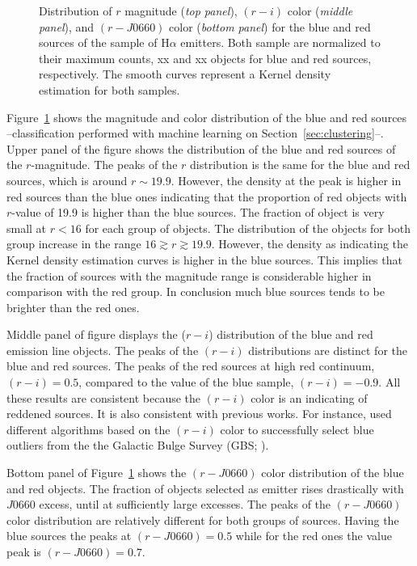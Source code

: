 \documentclass[fleqn,usenatbib]{mnras}
\begin{document}
\begin{figure}
\begin{tabular}{l l l}
  \end{tabular}
  \caption{Distribution of $r$ magnitude  (\textit{top panel}), $(r - i)$ color (\textit{middle panel}), and $(r - J0660)$
    color (\textit{bottom panel}) for the blue and red sources of the sample of H$\alpha$ emitters.
    Both sample are normalized to their maximum counts, xx and xx objects for blue and
    red sources, respectively. The smooth curves represent a Kernel density estimation for both samples.}
    \label{fig:diagram-distri}
\end{figure}

Figure~\ref{fig:diagram-distri} shows the magnitude and color distribution of the blue and red 
sources --classification performed with machine learning on Section~\ref{sec:clustering}--.
Upper panel of the figure shows the distribution of the blue and red sources of the $r$-magnitude.
The peaks of the $r$ distribution is the same for the blue and red sources, which is around
$r \sim 19.9$. However, the density at the peak is higher in red sources than the blue ones
indicating that the proportion of red objects with $r$-value of 19.9 is higher than the blue sources. 
The fraction of object is very small at $r < 16$ for each group of objects.
The distribution of the objects for both group increase in the range $16 \gtrsim r \gtrsim
19.9$. However, the density as indicating the Kernel density estimation curves is higher in 
the blue sources. This implies that the fraction of sources with the magnitude range 
is considerable higher in comparison with the red group. In conclusion much blue sources 
tends to be brighter than the red ones.

Middle panel of figure displays the ($r - i$) distribution of the blue and red emission line
objects. The peaks of the $(r - i)$ distributions are distinct for the blue and red sources.
The peaks of the red sources at high red continuum,  $(r - i) = 0.5$, compared to the value
of the blue sample, $(r - i) = -0.9$. All these results are consistent because the $(r - i)$
color is an indicating of reddened sources. It is also consistent with previous works. 
For instance, \citet{Wevers:2017} used different algorithms based on the  $(r - i)$ color
to successfully select blue outliers from the the Galactic Bulge 
Survey (GBS; \citealp{Jonker:2011}).

Bottom panel of Figure~\ref{fig:diagram-distri} shows the
$(r - J0660)$ color distribution of the blue and red objects. The fraction of objects selected
as emitter rises drastically with $J$0660 excess, until at sufficiently large excesses. 
The peaks of the $(r - J0660)$ color distribution are relatively different for both groups 
of sources. Having the blue sources the peaks at  $(r - J0660) = 0.5$ while for the red 
ones the value peak is $(r - J0660) = 0.7$.
\end{document}
